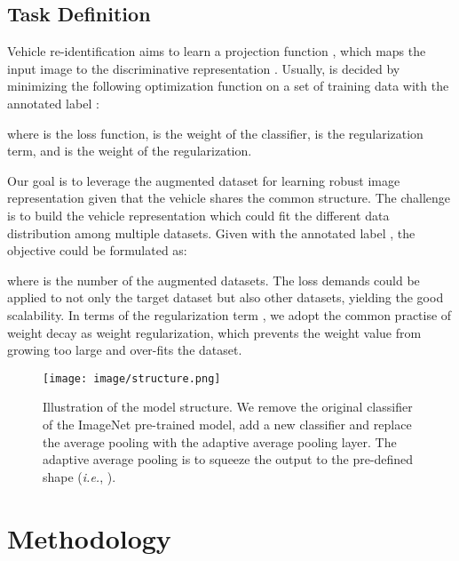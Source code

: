 \documentclass[journal]{IEEEtran}
\def\ie{\emph{i.e.}}
\begin{document}
\subsection{Task Definition}
Vehicle re-identification aims to learn a projection function , which maps the input image  to the discriminative representation . Usually,  is decided by minimizing the following optimization function on a set of training data  with the annotated label :

where  is the loss function,  is the weight of the classifier,  is the regularization term, and  is the weight of the regularization.

Our goal is to leverage the augmented dataset for learning robust image representation given that the vehicle shares the common structure. The challenge is to build the vehicle representation which could fit the different data distribution among multiple datasets. Given  with the annotated label , the objective could be formulated as:

where  is the number of the augmented datasets. The loss demands  could be applied to not only the target dataset but also other datasets, yielding the good scalability. In terms of the regularization term , we adopt the common practise of weight decay as weight regularization, which prevents the weight value from growing too large and over-fits the dataset. 

\begin{figure}[t]
\begin{center}
\texttt{[image: image/structure.png]}
\end{center}
\vspace{-.2in}
   \caption{Illustration of the model structure. We remove the original classifier of the ImageNet pre-trained model, add a new classifier and replace the average pooling with the adaptive average pooling layer. The adaptive average pooling is to squeeze the output to the pre-defined shape (\ie, ). }
\label{fig:structure}
\vspace{-.1in}
\end{figure}

\section{Methodology} \label{sec:method}
\end{document}
